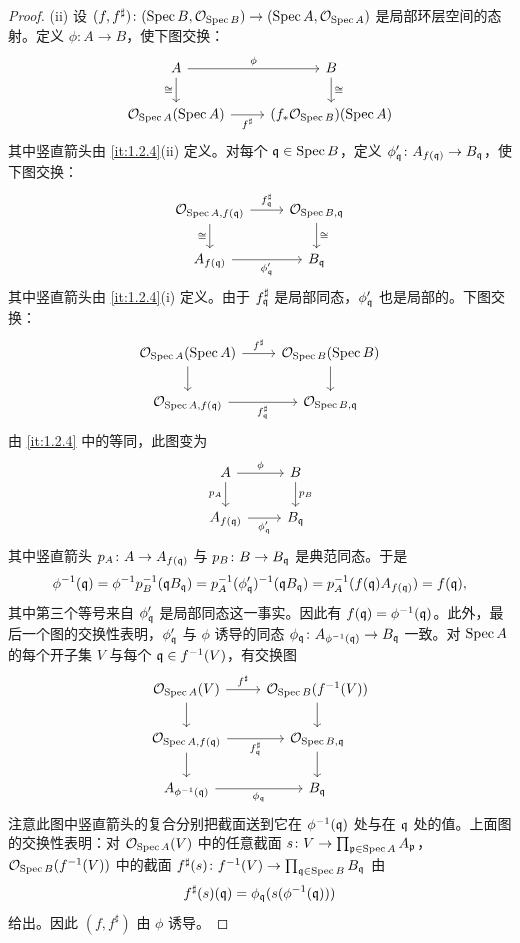\begin{proof}
(ii) 设 $(f,f^\sharp)\colon(\operatorname{Spec} B,\mathcal{O}_{\operatorname{Spec} B})\to(\operatorname{Spec} A,\mathcal{O}_{\operatorname{Spec} A})$ 是局部环层空间的态射。定义 $\phi\colon A\to B$，使下图交换：
\[
\begin{tikzcd}
A \arrow[r,"\phi"] \arrow[d,"\cong"'] & B \arrow[d,"\cong"] \\
\cO_{\Spec A}(\Spec A) \arrow[r,"f^\sharp"'] & (f_*\cO_{\Spec B})(\Spec A)
\end{tikzcd}
\]
其中竖直箭头由 \ref{it:1.2.4}(ii) 定义。对每个 $\mathfrak{q}\in\operatorname{Spec} B$，定义 $\phi'_{\mathfrak{q}}\colon A_{f(\mathfrak{q})}\to B_{\mathfrak{q}}$，使下图交换：
\[
\begin{tikzcd}
\cO_{\Spec A,f(\fq)} \arrow[r,"f^\sharp_{\fq}"] \arrow[d,"\cong"'] & \cO_{\Spec B,\fq} \arrow[d,"\cong"] \\
A_{f(\fq)} \arrow[r,"\phi'_{\fq}"'] & B_{\fq}
\end{tikzcd}
\]
其中竖直箭头由 \ref{it:1.2.4}(i) 定义。由于 $f^\sharp_{\mathfrak{q}}$ 是局部同态，$\phi'_{\mathfrak{q}}$ 也是局部的。下图交换：
\[
\begin{tikzcd}
\cO_{\Spec A}(\Spec A) \arrow[r,"f^\sharp"] \arrow[d] & \cO_{\Spec B}(\Spec B) \arrow[d] \\
\cO_{\Spec A,f(\fq)} \arrow[r,"f^\sharp_{\fq}"'] & \cO_{\Spec B,\fq}
\end{tikzcd}
\]
由 \ref{it:1.2.4} 中的等同，此图变为
\[
\begin{tikzcd}
A \arrow[r,"\phi"] \arrow[d,"p_A"'] & B \arrow[d,"p_B"] \\
A_{f(\fq)} \arrow[r,"\phi'_{\fq}"'] & B_{\fq}
\end{tikzcd}
\]
其中竖直箭头 $p_A\colon A\to A_{f(\mathfrak{q})}$ 与 $p_B\colon B\to B_{\mathfrak{q}}$ 是典范同态。于是
\[
\phi^{-1}(\mathfrak{q})=\phi^{-1}p_B^{-1}(\mathfrak{q} B_{\mathfrak{q}})=p_A^{-1}(\phi'_{\mathfrak{q}})^{-1}(\mathfrak{q} B_{\mathfrak{q}})=p_A^{-1}(f(\mathfrak{q})A_{f(\mathfrak{q})})=f(\mathfrak{q}),
\]
其中第三个等号来自 $\phi'_{\mathfrak{q}}$ 是局部同态这一事实。因此有 $f(\mathfrak{q})=\phi^{-1}(\mathfrak{q})$。此外，最后一个图的交换性表明，$\phi'_{\mathfrak{q}}$ 与 $\phi$ 诱导的同态 $\phi_{\mathfrak{q}}\colon A_{\phi^{-1}(\mathfrak{q})}\to B_{\mathfrak{q}}$ 一致。对 $\operatorname{Spec} A$ 的每个开子集 $V$ 与每个 $\mathfrak{q}\in f^{-1}(V)$，有交换图
\[
\begin{tikzcd}
\cO_{\Spec A}(V) \arrow[r,"f^\sharp"] \arrow[d] & \cO_{\Spec B}(f^{-1}(V)) \arrow[d] \\
\cO_{\Spec A,f(\fq)} \arrow[r,"f^\sharp_{\fq}"'] \arrow[d] & \cO_{\Spec B,\fq} \arrow[d] \\
A_{\phi^{-1}(\fq)} \arrow[r,"\phi_{\fq}"'] & B_{\fq}
\end{tikzcd}
\]
注意此图中竖直箭头的复合分别把截面送到它在 $\phi^{-1}(\mathfrak{q})$ 处与在 $\mathfrak{q}$ 处的值。上面图的交换性表明：对 $\mathcal{O}_{\operatorname{Spec} A}(V)$ 中的任意截面 $s\colon V\to\prod_{\mathfrak{p}\in\operatorname{Spec} A}A_{\mathfrak{p}}$，$\mathcal{O}_{\operatorname{Spec} B}(f^{-1}(V))$ 中的截面 $f^\sharp(s)\colon f^{-1}(V)\to\prod_{\mathfrak{q}\in\operatorname{Spec} B}B_{\mathfrak{q}}$ 由
\[
f^\sharp(s)(\mathfrak{q})=\phi_{\mathfrak{q}}(s(\phi^{-1}(\mathfrak{q})))
\]
给出。因此 $(f,f^\sharp)$ 由 $\phi$ 诱导。
\end{proof}

